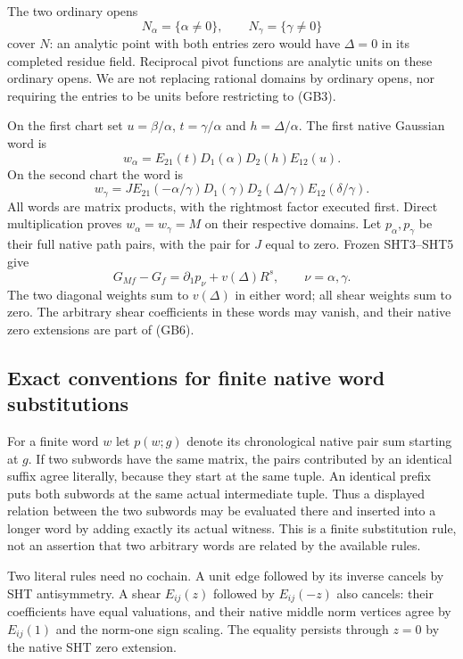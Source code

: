 The two ordinary opens
\[
 N_\alpha=\{\alpha\ne0\},\qquad N_\gamma=\{\gamma\ne0\}
 \tag{GB3}
\]
cover $N$: an analytic point with both entries zero would have
$\Delta=0$ in its completed residue field.  Reciprocal pivot
functions are analytic units on these ordinary opens.  We are not
replacing rational domains by ordinary opens, nor requiring the
entries to be units before restricting to (GB3).

On the first chart set $u=\beta/\alpha$, $t=\gamma/\alpha$ and
$h=\Delta/\alpha$.  The first native Gaussian word is
\[
               w_\alpha=E_{21}(t)D_1(\alpha)D_2(h)E_{12}(u).
 \tag{GB4}
\]
On the second chart the word is
\[
        w_\gamma=J E_{21}(-\alpha/\gamma)
            D_1(\gamma)D_2(\Delta/\gamma)E_{12}(\delta/\gamma).
 \tag{GB5}
\]
All words are matrix products, with the rightmost factor executed
first.  Direct multiplication proves $w_\alpha=w_\gamma=M$ on
their respective domains.  Let $p_\alpha,p_\gamma$ be their full
native path pairs, with the pair for $J$ equal to zero.  Frozen
SHT3--SHT5 give
\[
 G_{Mf}-G_f=\partial_1p_\nu+v(\Delta)R^s,
                 \qquad \nu=\alpha,\gamma.
 \tag{GB6}
\]
The two diagonal weights sum to $v(\Delta)$ in either word; all
shear weights sum to zero.  The arbitrary shear coefficients in
these words may vanish, and their native zero extensions are part
of (GB6).

\subsection{Exact conventions for finite native word substitutions}

For a finite word $w$ let $p(w;g)$ denote its chronological native
pair sum starting at $g$.  If two subwords have the same matrix,
the pairs contributed by an identical suffix agree literally,
because they start at the same tuple.  An identical prefix puts
both subwords at the same actual intermediate tuple.  Thus a
displayed relation between the two subwords may be evaluated there
and inserted into a longer word by adding exactly its actual
witness.  This is a finite substitution rule, not an assertion
that two arbitrary words are related by the available rules.

Two literal rules need no cochain.  A unit edge followed by its
inverse cancels by SHT antisymmetry.  A shear $E_{ij}(z)$ followed
by $E_{ij}(-z)$ also cancels: their coefficients have equal
valuations, and their native middle norm vertices agree by
$E_{ij}(1)$ and the norm-one sign scaling.  The equality persists
through $z=0$ by the native SHT zero extension.

